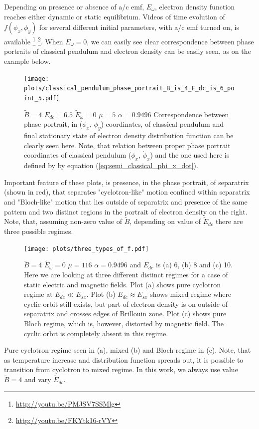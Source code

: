 \documentclass[40pt,letterpaper,physrev]{article}
\begin{document}
    Depending on presence or absence
    of a/c emf, $E_\omega$, electron density function reaches either dynamic or static equilibrium. Videos of 
    time evolution of $f(\phi_x,\phi_y)$ for several different initial parameters, with a/c emf turned on, is
    available \footnote{\url{http://youtu.be/PMJSV7SSMlg}} \footnote{\url{http://youtu.be/FKYtk16-rVY}}. When 
    $E_{\omega}=0$, we can easily see clear correspondence between phase portraits of classical pendulum and
    electron density can be easily seen, as on the example below.
    \begin{figure}[H]
   	  \centering
	  \normalsize %
	  \texttt{[image: plots/classical\_pendulum\_phase\_portrait\_B\_is\_4\_E\_dc\_is\_6\_point\_5.pdf]}
	  \label{fig:classical_and_Boltzmann_correspondence_map}
	  \caption{$\tilde{B}=4$ $E_{dc}=6.5$ $\tilde{E}_{\omega}=0$ $\mu=5$ $\alpha=0.9496$
	  Correspondence between phase portrait, in ($\phi_x$, $\phi_y$) coordinates, of classical pendulum and final
	  stationary state of electron density distribution function can be clearly seen here. Note, that relation
	  between proper phase portrait coordinates of classical pendulum ($\phi_x$, $\dot{\phi}_x$) and the one 
	  used here is defined by by equation (\ref{eq:semi_classical_phi_x_dot}).}
	\end{figure}
	Important feature of these plots, is presence, in the phase portrait, of separatrix (shown in red), that separates
	"cyclotron-like" motion confined within separatrix and "Bloch-like" motion that lies outside of separatrix and 
	presence of the same pattern and two distinct regions in the portrait of electron density on the right. Note, that,
	assuming non-zero value of $\tilde{B}$, depending on value of $\tilde{E}_{dc}$ there are three possible regimes.
    \begin{figure}[H]
   	  \centering
	  \normalsize %
	  \texttt{[image: plots/three\_types\_of\_f.pdf]}
	  \label{fig:three_regimes}
	  \caption{$\tilde{B}=4$ $\tilde{E}_{\omega}=0$ $\mu=116$ $\alpha=0.9496$ 
	  and $E_{dc}$ is (a) 6, (b) 8 and (c) 10. Here we are looking at three different distinct regimes for a
	  case of static electric and magnetic fields. Plot (a) shows pure cyclotron regime at $E_{dc}\ll E_{sx}$.
	  Plot (b) $E_{dc}\approx E_{sx}$ shows mixed regime where cyclic orbit still exists, but part of electron
	  density is on outside of separatrix and crosses edges of Brillouin zone. Plot (c) shows pure Bloch regime,
	  which is, however, distorted by magnetic field. The cyclic orbit is completely absent in this regime.}
	\end{figure}
	Pure cyclotron regime seen in (a), mixed (b) and Bloch regime in (c). Note, that as temperature increase and
	distribution function spreads out, it is possible to transition from cyclotron to mixed regime. In this work, 
	we always use value $\tilde{B} = 4$ and vary $\tilde{E}_{dc}$. 
    
\end{document}
